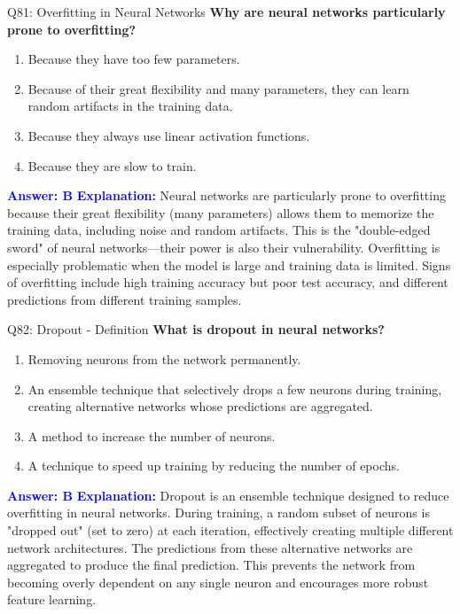 \documentclass[8pt]{beamer}
\begin{document}
	\begin{frame}{Q81: Overfitting in Neural Networks}
		\fontsize{6.5}{7.5}\selectfont
		\textbf{Why are neural networks particularly prone to overfitting?}
		\begin{enumerate}
			\item Because they have too few parameters.
			\item Because of their great flexibility and many parameters, they can learn random artifacts in the training data.
			\item Because they always use linear activation functions.
			\item Because they are slow to train.
		\end{enumerate}
		\vspace{0.1cm}
		\textcolor{blue}{\textbf{Answer: B}}
		\vspace{0.1cm}
		\textcolor{blue}{\textbf{Explanation:}} Neural networks are particularly prone to overfitting because their great flexibility (many parameters) allows them to memorize the training data, including noise and random artifacts. This is the "double-edged sword" of neural networks—their power is also their vulnerability. Overfitting is especially problematic when the model is large and training data is limited. Signs of overfitting include high training accuracy but poor test accuracy, and different predictions from different training samples.
	\end{frame}
	
	\begin{frame}{Q82: Dropout - Definition}
		\fontsize{6.5}{7.5}\selectfont
		\textbf{What is dropout in neural networks?}
		\begin{enumerate}
			\item Removing neurons from the network permanently.
			\item An ensemble technique that selectively drops a few neurons during training, creating alternative networks whose predictions are aggregated.
			\item A method to increase the number of neurons.
			\item A technique to speed up training by reducing the number of epochs.
		\end{enumerate}
		\vspace{0.1cm}
		\textcolor{blue}{\textbf{Answer: B}}
		\vspace{0.1cm}
		\textcolor{blue}{\textbf{Explanation:}} Dropout is an ensemble technique designed to reduce overfitting in neural networks. During training, a random subset of neurons is "dropped out" (set to zero) at each iteration, effectively creating multiple different network architectures. The predictions from these alternative networks are aggregated to produce the final prediction. This prevents the network from becoming overly dependent on any single neuron and encourages more robust feature learning.
	\end{frame}
	
\end{document}

